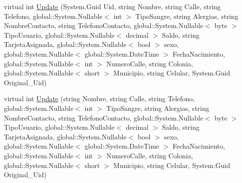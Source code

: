 \begin{DoxyCompactItemize}
\item 
virtual int \hyperlink{class_proyecto___integrador__3_1_1ds_usuarios_table_adapters_1_1_usuarios_table_adapter_ad3c95d16bd229a4017bcc53351f7fcea}{Update} (System.\-Guid Uid, string Nombre, string Calle, string Telefono, global\-::\-System.\-Nullable$<$ int $>$ Tipo\-Sangre, string Alergias, string Nombre\-Contacto, string Telefono\-Contacto, global\-::\-System.\-Nullable$<$ byte $>$ Tipo\-Usuario, global\-::\-System.\-Nullable$<$ decimal $>$ Saldo, string Tarjeta\-Asignada, global\-::\-System.\-Nullable$<$ bool $>$ sexo, global\-::\-System.\-Nullable$<$ global\-::\-System.\-Date\-Time $>$ Fecha\-Nacimiento, global\-::\-System.\-Nullable$<$ int $>$ Numero\-Calle, string Colonia, global\-::\-System.\-Nullable$<$ short $>$ Municipio, string Celular, System.\-Guid Original\-\_\-\-Uid)
\item 
virtual int \hyperlink{class_proyecto___integrador__3_1_1ds_usuarios_table_adapters_1_1_usuarios_table_adapter_ad1e68781eac45453d074bde517d8d1bf}{Update} (string Nombre, string Calle, string Telefono, global\-::\-System.\-Nullable$<$ int $>$ Tipo\-Sangre, string Alergias, string Nombre\-Contacto, string Telefono\-Contacto, global\-::\-System.\-Nullable$<$ byte $>$ Tipo\-Usuario, global\-::\-System.\-Nullable$<$ decimal $>$ Saldo, string Tarjeta\-Asignada, global\-::\-System.\-Nullable$<$ bool $>$ sexo, global\-::\-System.\-Nullable$<$ global\-::\-System.\-Date\-Time $>$ Fecha\-Nacimiento, global\-::\-System.\-Nullable$<$ int $>$ Numero\-Calle, string Colonia, global\-::\-System.\-Nullable$<$ short $>$ Municipio, string Celular, System.\-Guid Original\-\_\-\-Uid)
\end{DoxyCompactItemize}
